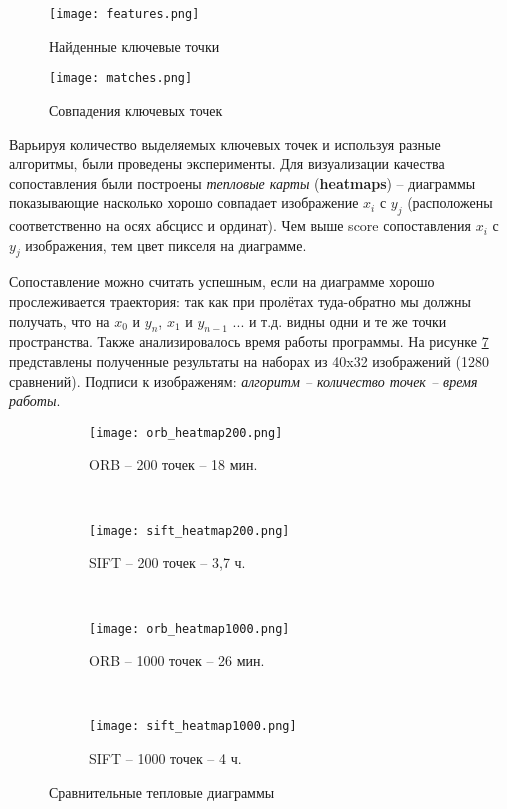 \begin{figure}[h]
    \centering
    \texttt{[image: features.png]}
    \caption{Найденные ключевые точки}
    \label{fig:features}
\end{figure}

\begin{figure}[h]
    \centering
    \texttt{[image: matches.png]}
    \caption{Совпадения ключевых точек}
    \label{fig:matches}
\end{figure}

Варьируя количество выделяемых ключевых точек и используя разные алгоритмы, были проведены эксперименты. Для визуализации качества сопоставления были построены \textit{тепловые карты} (\textbf{heatmaps}) -- диаграммы показывающие насколько хорошо совпадает изображение $x_i$ с $y_j$ (расположены соответственно на осях абсцисс и ординат). Чем выше score сопоставления $x_i$ с $y_j$ изображения, тем  цвет пикселя на диаграмме.

Сопоставление можно считать успешным, если на диаграмме хорошо прослеживается траектория: так как при пролётах туда-обратно мы должны получать, что на $x_0$ и $y_n$, $x_1$ и $y_{n-1}$ ... и т.д. видны одни и те же точки пространства. Также анализировалось время работы программы. На рисунке \ref{fig:heatmaps} представлены полученные результаты на наборах из 40x32 изображений (1280 сравнений). Подписи к изображеням: \textit{алгоритм -- количество точек -- время работы}.

\begin{figure}[h]
    \centering
    \begin{subfigure}[h]{0.45\textwidth}
        \texttt{[image: orb\_heatmap200.png]}
        \caption{ORB -- 200 точек -- 18 мин.}
        \label{fig:orb_200}
    \end{subfigure}
    ~
    \begin{subfigure}[h]{0.45\textwidth}
        \texttt{[image: sift\_heatmap200.png]}
        \caption{SIFT -- 200 точек -- 3,7 ч.}
        \label{fig:sift_200}
    \end{subfigure}
    ~
    \begin{subfigure}[h]{0.45\textwidth}
        \texttt{[image: orb\_heatmap1000.png]}
        \caption{ORB -- 1000 точек -- 26 мин.}
        \label{fig:mouse}
    \end{subfigure}
    ~
    \begin{subfigure}[h]{0.45\textwidth}
        \texttt{[image: sift\_heatmap1000.png]}
        \caption{SIFT -- 1000 точек -- 4 ч.}
        \label{fig:mouse}
    \end{subfigure}
    \caption{Сравнительные тепловые диаграммы}
    \label{fig:heatmaps}
\end{figure}

